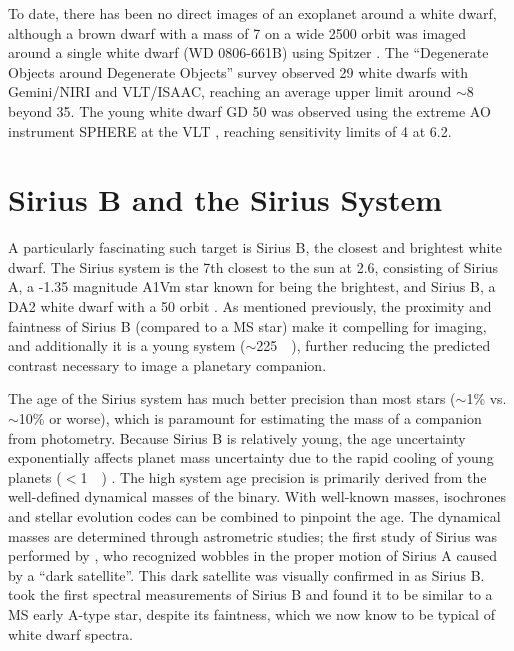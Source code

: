 \documentclass[twocolumn]{aastex631}
\begin{document}
To date, there has been no direct images of an exoplanet around a white dwarf, although a brown dwarf with a mass of \qty{7}{\jupitermass} on a wide \qty{2500}{\au} orbit was imaged around a single white dwarf (WD 0806-661B) using Spitzer \citep{luhman_discovery_2011}. The ``Degenerate Objects around Degenerate Objects'' survey \citep[DODO;][]{hogan_dodo_2009} observed 29 white dwarfs with Gemini/NIRI and VLT/ISAAC, reaching an average upper limit around $\sim$\qty{8}{\jupitermass} beyond \qty{35}{\au}. The young white dwarf GD 50 was observed using the extreme AO instrument SPHERE at the VLT \citep{xu_extreme-ao_2015}, reaching sensitivity limits of \qty{4}{\jupitermass} at \qty{6.2}{\au}.

\section{Sirius B and the Sirius System}

A particularly fascinating such target is Sirius B, the closest and brightest white dwarf. The Sirius system is the 7th closest to the sun at \qty{2.6}{\parsec}, consisting of Sirius A, a -1.35 magnitude A1Vm star known for being the brightest, and Sirius B, a DA2 white dwarf with a \qty{50}{\year} orbit \citep{bond_sirius_2017,gaia_collaboration_gaia_2018}. As mentioned previously, the proximity and faintness of Sirius B (compared to a MS star) make it compelling for imaging, and additionally it is a young system ($\sim$\qty{225}{\mega\year}), further reducing the predicted contrast necessary to image a planetary companion.

The age of the Sirius system has much better precision than most stars ($\sim$1\% vs. $\sim$10\% or worse), which is paramount for estimating the mass of a companion from photometry. Because Sirius B is relatively young, the age uncertainty exponentially affects planet mass uncertainty due to the rapid cooling of young planets ($<$\qty{1}{\giga\year}) \citep{fortney_giant_2010}. The high system age precision is primarily derived from the well-defined dynamical masses of the binary. With well-known masses, isochrones and stellar evolution codes can be combined to pinpoint the age. The dynamical masses are determined through astrometric studies; the first study of Sirius was performed by \citet{bessel_variations_1844}, who recognized wobbles in the proper motion of Sirius A caused by a ``dark satellite''. This dark satellite was visually confirmed in \citet{bond_companion_1862} as Sirius B. \citet{adams_spectrum_1915} took the first spectral measurements of Sirius B and found it to be similar to a MS early A-type star, despite its faintness, which we now know to be typical of white dwarf spectra.
\end{document}
